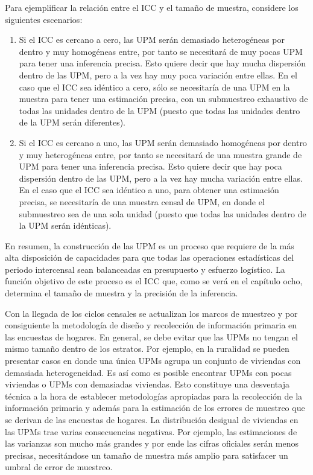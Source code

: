 \documentclass[
  12pt,
]{book}
\begin{document}
Para ejemplificar la relación entre el ICC y el tamaño de muestra, considere los siguientes escenarios:

\begin{enumerate}
\def\labelenumi{\arabic{enumi}.}
\item
  Si el ICC es cercano a cero, las UPM serán demasiado heterogéneas por dentro y muy homogéneas entre, por tanto se necesitará de muy pocas UPM para tener una inferencia precisa. Esto quiere decir que hay mucha dispersión dentro de las UPM, pero a la vez hay muy poca variación entre ellas. En el caso que el ICC sea idéntico a cero, sólo se necesitaría de una UPM en la muestra para tener una estimación precisa, con un submuestreo exhaustivo de todas las unidades dentro de la UPM (puesto que todas las unidades dentro de la UPM serán diferentes).
\item
  Si el ICC es cercano a uno, las UPM serán demasiado homogéneas por dentro y muy heterogéneas entre, por tanto se necesitará de una muestra grande de UPM para tener una inferencia precisa. Esto quiere decir que hay poca dispersión dentro de las UPM, pero a la vez hay mucha variación entre ellas. En el caso que el ICC sea idéntico a uno, para obtener una estimación precisa, se necesitaría de una muestra censal de UPM, en donde el submuestreo sea de una sola unidad (puesto que todas las unidades dentro de la UPM serán idénticas).
\end{enumerate}

En resumen, la construcción de las UPM es un proceso que requiere de la más alta disposición de capacidades para que todas las operaciones estadísticas del periodo intercensal sean balanceadas en presupuesto y esfuerzo logístico. La función objetivo de este proceso es el ICC que, como se verá en el capítulo ocho, determina el tamaño de muestra y la precisión de la inferencia.

Con la llegada de los ciclos censales se actualizan los marcos de muestreo y por consiguiente la metodología de diseño y recolección de información primaria en las encuestas de hogares. En general, se debe evitar que las UPMs no tengan el mismo tamaño dentro de los estratos. Por ejemplo, en la ruralidad se pueden presentar casos en donde una única UPMs agrupa un conjunto de viviendas con demasiada heterogeneidad. Es así como es posible encontrar UPMs con pocas viviendas o UPMs con demasiadas viviendas. Esto constituye una desventaja técnica a la hora de establecer metodologías apropiadas para la recolección de la información primaria y además para la estimación de los errores de muestreo que se derivan de las encuestas de hogares. La distribución desigual de viviendas en las UPMs trae varias consecuencias negativas. Por ejemplo, las estimaciones de las varianzas son mucho más grandes y por ende las cifras oficiales serán menos precisas, necesitándose un tamaño de muestra más amplio para satisfacer un umbral de error de muestreo.
\end{document}
